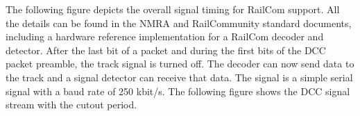 The following figure depicts the overall signal timing for RailCom support. All the details can be found in the NMRA and RailCommunity standard documents, including a hardware reference implementation for a RailCom decoder and detector. After the last bit of a packet and during the first bits of the DCC packet preamble, the track signal is turned off. The decoder can now send data to the track and a signal detector can receive that data. The signal is a simple serial signal with a baud rate of 250 kbit/s. The following figure shows the DCC signal stream with the cutout period.

\begin{center}
\end{center}
